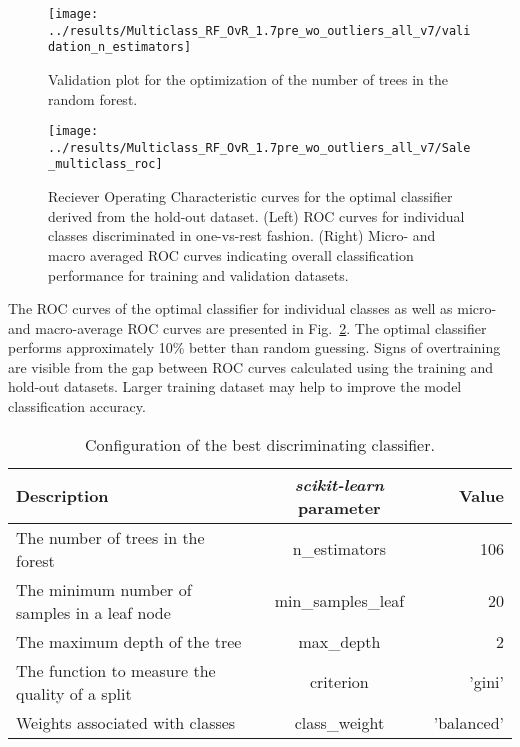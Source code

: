 \documentclass[14pt]{scrartcl}
\begin{document}
\begin{figure}[htpb!]
   \centering
   \texttt{[image: ../results/Multiclass\_RF\_OvR\_1.7pre\_wo\_outliers\_all\_v7/validation\_n\_estimators]}\\
   \caption{Validation plot for the optimization of the number of trees in the
   random forest.}
   \label{fig:validation_n_estimators}
\end{figure}
\begin{figure}[htpb!]
    \centering
    \texttt{[image: ../results/Multiclass\_RF\_OvR\_1.7pre\_wo\_outliers\_all\_v7/Sale\_multiclass\_roc]}\\
    \caption{Reciever Operating Characteristic curves for the optimal
    classifier derived from the hold-out dataset. (Left) ROC curves for individual classes discriminated in one-vs-rest
    fashion. (Right) Micro- and macro averaged ROC curves indicating overall
    classification performance for training and validation datasets.}
    \label{fig:roc_curves}
 \end{figure}

The ROC curves of the optimal classifier for individual classes as well as micro-
and macro-average ROC curves are presented in Fig.~\ref{fig:roc_curves}. The optimal
classifier performs approximately 10\% better than random guessing. Signs of
overtraining are visible from the gap between ROC curves calculated using the
training and hold-out datasets. Larger training dataset may help to improve the model
classification accuracy.

\begin{table}[htpb!]
    \centering
    \begin{tabular}{ l c | r }
        Description & \textbf{\textsl{scikit-learn}} parameter & Value \\
        \hline
        The number of trees in the forest & n\_estimators & 106 \\
        The minimum number of samples in a leaf node & min\_samples\_leaf & 20 \\
        The maximum depth of the tree & max\_depth & 2 \\
        The function to measure the quality of a split & criterion & 'gini' \\
        Weights associated with classes  & class\_weight & 'balanced'\\
    \end{tabular}
    \caption{Configuration of the best discriminating classifier.}\label{tab:rf_params}
\end{table}
\end{document}
